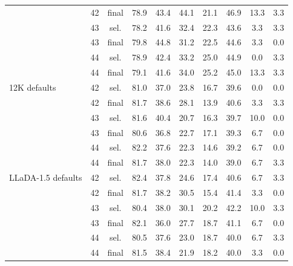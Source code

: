 \begin{table}[h]
\begin{center}
{\begin{tabular}{llcccccccc}
 & 42 & final & 78.9 & 43.4 & 44.1 & 21.1 & 46.9 & 13.3 & 3.3 \\
 & 43 & sel. & 78.2 & 41.6 & 32.4 & 22.3 & 43.6 & 3.3 & 3.3 \\
 & 43 & final & 79.8 & 44.8 & 31.2 & 22.5 & 44.6 & 3.3 & 0.0 \\
 & 44 & sel. & 78.9 & 42.4 & 33.2 & 25.0 & 44.9 & 0.0 & 3.3 \\
 & 44 & final & 79.1 & 41.6 & 34.0 & 25.2 & 45.0 & 13.3 & 3.3 \\
\midrule
12K defaults & 42 & sel. & 81.0 & 37.0 & 23.8 & 16.7 & 39.6 & 0.0 & 0.0 \\
 & 42 & final & 81.7 & 38.6 & 28.1 & 13.9 & 40.6 & 3.3 & 3.3 \\
 & 43 & sel. & 81.6 & 40.4 & 20.7 & 16.3 & 39.7 & 10.0 & 0.0 \\
 & 43 & final & 80.6 & 36.8 & 22.7 & 17.1 & 39.3 & 6.7 & 0.0 \\
 & 44 & sel. & 82.2 & 37.6 & 22.3 & 14.6 & 39.2 & 6.7 & 0.0 \\
 & 44 & final & 81.7 & 38.0 & 22.3 & 14.0 & 39.0 & 6.7 & 3.3 \\
\midrule
LLaDA-1.5 defaults & 42 & sel. & 82.4 & 37.8 & 24.6 & 17.4 & 40.6 & 6.7 & 3.3 \\
 & 42 & final & 81.7 & 38.2 & 30.5 & 15.4 & 41.4 & 3.3 & 0.0 \\
 & 43 & sel. & 80.4 & 38.0 & 30.1 & 20.2 & 42.2 & 10.0 & 3.3 \\
 & 43 & final & 82.1 & 36.0 & 27.7 & 18.7 & 41.1 & 6.7 & 0.0 \\
 & 44 & sel. & 80.5 & 37.6 & 23.0 & 18.7 & 40.0 & 6.7 & 3.3 \\
 & 44 & final & 81.5 & 38.4 & 21.9 & 18.2 & 40.0 & 3.3 & 0.0 \\
\bottomrule
\end{tabular}}
\end{center}
\end{table}
